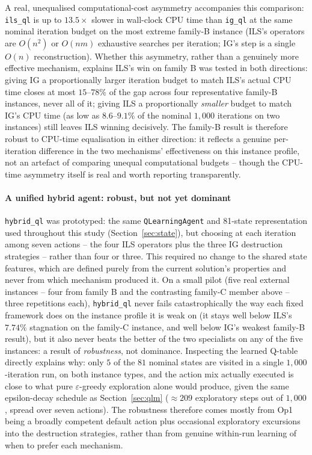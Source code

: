 \documentclass[final,3p,times,11pt,authoryear]{elsarticle}
\begin{document}
A real, unequalised computational-cost asymmetry accompanies this
comparison: \texttt{ils\_ql} is up to $13.5\times$ slower in wall-clock
CPU time than \texttt{ig\_ql} at the same nominal iteration budget on
the most extreme family-B instance (ILS's operators are $O(n^2)$ or
$O(nm)$ exhaustive searches per iteration; IG's step is a single
$O(n)$ reconstruction). Whether this asymmetry, rather than
a genuinely more effective mechanism, explains ILS's win on family B
was tested in both directions: giving IG a proportionally larger iteration budget
to match ILS's actual CPU time closes at most $15$--$78\%$ of the gap
across four representative family-B instances, never all of it; giving
ILS a proportionally \emph{smaller} budget to match IG's CPU time (as
low as $8.6$--$9.1\%$ of the nominal $1{,}000$ iterations on two
instances) still leaves ILS winning decisively. The family-B result is
therefore robust to CPU-time equalisation in either direction: it
reflects a genuine per-iteration difference in the two mechanisms'
effectiveness on this instance profile, not an artefact of comparing
unequal computational budgets -- though the CPU-time asymmetry itself
is real and worth reporting transparently.

\paragraph{A unified hybrid agent: robust, but not yet dominant}
\texttt{hybrid\_ql} was prototyped: the same \texttt{QLearningAgent}
and 81-state representation used throughout this study
(Section~\ref{sec:state}), but choosing at each iteration among seven
actions -- the four ILS operators plus the three IG destruction
strategies -- rather than four or three. This required no change to
the shared state features, which are defined purely from the current
solution's properties and never from which mechanism produced it. On
a small pilot (five real external instances -- four from family B and
the contrasting family-C member above -- three repetitions each),
\texttt{hybrid\_ql} never fails catastrophically the way each fixed
framework does on the instance profile it is weak on (it stays well
below ILS's $7.74\%$ stagnation on the family-C instance, and well
below IG's weakest family-B result), but it also never beats the
better of the two specialists on any of the five instances: a result
of \emph{robustness}, not dominance. Inspecting the learned Q-table
directly explains why: only $5$ of the $81$ nominal states are
visited in a single $1{,}000$-iteration run, on both instance types,
and the action mix actually executed is close to what pure
$\varepsilon$-greedy exploration alone would produce, given the same
epsilon-decay schedule as Section~\ref{sec:qlm} ($\approx 209$
exploratory steps out of $1{,}000$, spread over seven actions).
The robustness therefore comes mostly from Op1 being a broadly
competent default action plus occasional exploratory excursions into
the destruction strategies, rather than from genuine within-run
learning of when to prefer each mechanism.
\end{document}
